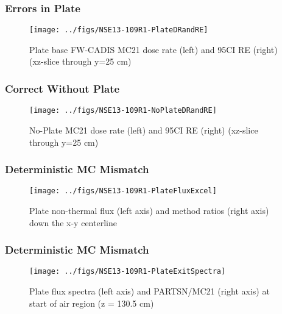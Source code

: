 \documentclass[xcolor=x11names,compress]{beamer}
\renewcommand{\(}{\begin{columns}}
\renewcommand{\)}{\end{columns}}
\newcommand{\<}[1]{\begin{column}{#1}}
\renewcommand{\>}{\end{column}}
\begin{document}
\begin{frame}[fragile]
  \frametitle{Errors in Plate}
 \begin{figure}[p]
   \begin{center}
     \texttt{[image: ../figs/NSE13-109R1-PlateDRandRE]}
   \end{center}
   \caption{Plate base FW-CADIS MC21 dose rate (left) and 95CI RE (right) (xz-slice through y=25 cm)}
   \label{fig:Plate}
 \end{figure}
\end{frame}

\begin{frame}[fragile]
  \frametitle{Correct Without Plate}
 \begin{figure}[p]
   \begin{center}
     \texttt{[image: ../figs/NSE13-109R1-NoPlateDRandRE]}
   \end{center}
   \caption{No-Plate MC21 dose rate (left) and 95CI RE (right) (xz-slice through y=25 cm)}
   \label{fig:noPlate}
 \end{figure}
\end{frame}

\begin{frame}[fragile]
  \frametitle{Deterministic MC Mismatch}
 \begin{figure}[p]
   \begin{center}
     \texttt{[image: ../figs/NSE13-109R1-PlateFluxExcel]}
   \end{center}
   \caption{Plate non-thermal flux (left axis) and method ratios (right axis) down the x-y centerline}
   \label{fig:PlateFlux}
 \end{figure}
\end{frame}

\begin{frame}[fragile]
  \frametitle{Deterministic MC Mismatch}
 \begin{figure}[p]
   \begin{center}
     \texttt{[image: ../figs/NSE13-109R1-PlateExitSpectra]}
   \end{center}
   \caption{Plate flux spectra (left axis) and PARTSN/MC21 (right axis) at start of air region (z = 130.5 cm)}
   \label{fig:PlateExit}
 \end{figure}
\end{frame}
\end{document}

